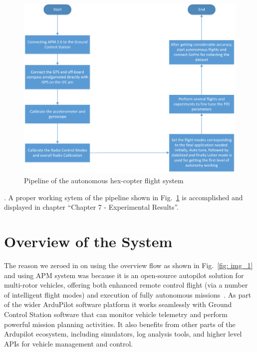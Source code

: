 \begin{figure}[!h]
	\includegraphics[width=1.0\linewidth]{asda}
	\centering
	\caption{\label{fig: asda}Pipeline of the autonomous hex-copter flight system}
\end{figure}.
A proper working sytem of the pipeline shown in Fig.~\ref{fig: asda} is accomplished and displayed in chapter ``Chapter 7 - Experimental Results''.


\section{Overview of the System}


The reason we zeroed in on using the overview flow as shown in Fig.~\ref{fig: img_1} and using APM system was because it is an open-source autopilot solution for multi-rotor vehicles, offering both enhanced remote control flight (via a number of intelligent flight modes) and execution of fully autonomous missions~\cite{19}. As part of the wider ArduPilot software platform it works seamlessly with Ground Control Station software that can monitor vehicle telemetry and perform powerful mission planning activities. It also benefits from other parts of the Ardupilot ecosystem, including simulators, log analysis tools, and higher level APIs for vehicle management and control. 

